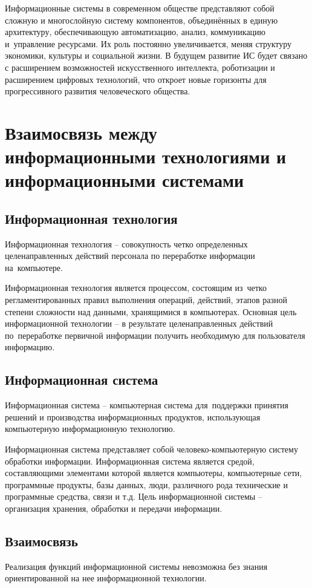 \documentclass{ou}
\begin{document}
Информационные системы в современном обществе представляют собой сложную и многослойную систему компонентов, объединённых в единую архитектуру, обеспечивающую автоматизацию, анализ, коммуникацию и~управление ресурсами. Их роль постоянно увеличивается, меняя структуру экономики, культуры и социальной жизни. В будущем развитие ИС будет связано с расширением возможностей искусственного интеллекта, роботизации и расширением цифровых технологий, что откроет новые горизонты для прогрессивного развития человеческого общества.
\newpage
\section{Взаимосвязь между информационными технологиями и информационными системами}
\subsection{Информационная технология}
Информационная технология -- совокупность четко определенных целенаправленных действий персонала по переработке информации на~компьютере.

Информационная технология является процессом, состоящим из~четко регламентированных правил выполнения операций, действий, этапов разной степени сложности над данными, хранящимися в компьютерах. Основная цель информационной технологии -- в результате целенаправленных действий по~переработке первичной информации получить необходимую для пользователя информацию.
\subsection{Информационная система}
Информационная система -- компьютерная система для~поддержки принятия решений и производства информационных продуктов, использующая компьютерную информационную технологию.

Информационная система представляет собой человеко-компьютерную систему обработки информации. Информационная система является средой, составляющими элементами которой является компьютеры, компьютерные сети, программные продукты, базы данных, люди, различного рода технические и программные средства, связи и т.д. Цель информационной системы -- организация хранения, обработки и передачи информации.
\subsection{Взаимосвязь}
Реализация функций информационной системы невозможна без знания ориентированной на нее информационной технологии. 
\end{document}
